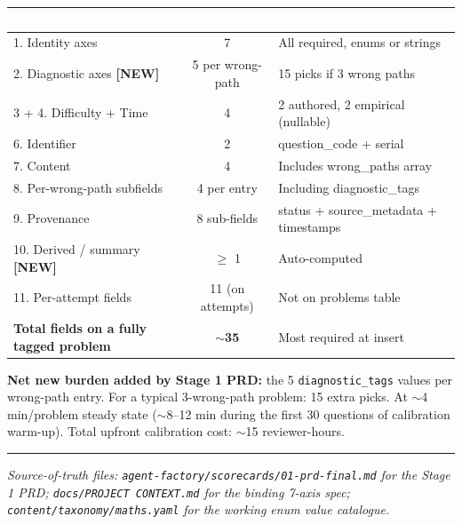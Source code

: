 \documentclass[11pt,letterpaper]{article}
\newcommand{\cd}[1]{\texttt{\small #1}}
\newcommand{\NEW}{\textcolor{accent}{\textbf{[NEW]}}}
\begin{document}
\begin{tabular}{|p{6.5cm}|c|p{5.5cm}|}
\hline
\rowcolor{headergray}\textcolor{white}{\textbf{Group}} & \textcolor{white}{\textbf{Fields}} & \textcolor{white}{\textbf{Notes}} \\
\hline
1. Identity axes & 7 & All required, enums or strings \\
\rowcolor{altrow}2. Diagnostic axes \NEW{} & 5 per wrong-path & 15 picks if 3 wrong paths \\
3 + 4. Difficulty + Time & 4 & 2 authored, 2 empirical (nullable) \\
\rowcolor{altrow}6. Identifier & 2 & question\_code + serial \\
7. Content & 4 & Includes wrong\_paths array \\
\rowcolor{altrow}8. Per-wrong-path subfields & 4 per entry & Including diagnostic\_tags \\
9. Provenance & 8 sub-fields & status + source\_metadata + timestamps \\
\rowcolor{altrow}10. Derived / summary \NEW{} & $\geq$ 1 & Auto-computed \\
11. Per-attempt fields & 11 (on attempts) & Not on problems table \\
\hline
\rowcolor{newhl}\textbf{Total fields on a fully tagged problem} & $\sim$\textbf{35} & Most required at insert \\
\hline
\end{tabular}

\bigskip
\textbf{Net new burden added by Stage 1 PRD:} the 5 \cd{diagnostic\_tags} values per wrong-path entry. For a typical 3-wrong-path problem: 15 extra picks. At $\sim$4 min/problem steady state ($\sim$8--12 min during the first 30 questions of calibration warm-up). Total upfront calibration cost: $\sim$15 reviewer-hours.

\bigskip\hrule\bigskip

\noindent\small
\textit{Source-of-truth files: \cd{agent-factory/scorecards/01-prd-final.md} for the Stage 1 PRD; \cd{docs/PROJECT CONTEXT.md} for the binding 7-axis spec; \cd{content/taxonomy/maths.yaml} for the working enum value catalogue.}
\end{document}

